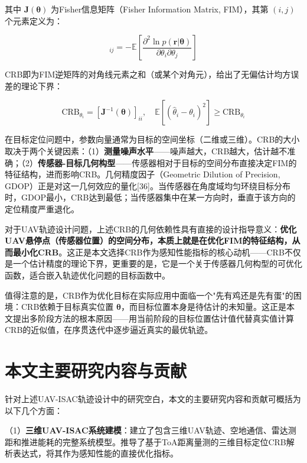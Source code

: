 其中 $\mathbf{J}(\bm{\theta})$ 为Fisher信息矩阵（Fisher Information Matrix, FIM），其第 $(i,j)$ 个元素定义为：

\begin{equation}
[\mathbf{J}(\bm{\theta})]_{ij}=-\mathbb{E}\left[\frac{\partial^2\ln p(\mathbf{r}|\bm{\theta})}{\partial\theta_i\partial\theta_j}\right]
\label{eq:fim_definition}
\end{equation}

CRB即为FIM逆矩阵的对角线元素之和（或某个对角元），给出了无偏估计均方误差的理论下界：

\begin{equation}
\mathrm{CRB}_{\theta_i}=[\mathbf{J}^{-1}(\bm{\theta})]_{ii},\quad \mathbb{E}[(\hat{\theta}_i-\theta_i)^2]\geq\mathrm{CRB}_{\theta_i}
\label{eq:crb_element}
\end{equation}

在目标定位问题中，参数向量通常为目标的空间坐标（二维或三维）。CRB的大小取决于两个关键因素：（1）\textbf{测量噪声水平}——噪声越大，CRB越大，估计越不准确；（2）\textbf{传感器-目标几何构型}——传感器相对于目标的空间分布直接决定FIM的特征结构，进而影响CRB。几何精度因子（Geometric Dilution of Precision, GDOP）正是对这一几何效应的量化[36]。当传感器在角度域均匀环绕目标分布时，GDOP最小，CRB达到最低；当传感器集中在某一方向时，垂直于该方向的定位精度严重退化。

对于UAV轨迹设计问题，上述CRB的几何依赖性具有直接的设计指导意义：\textbf{优化UAV悬停点（传感器位置）的空间分布，本质上就是在优化FIM的特征结构，从而最小化CRB}。这正是本文选择CRB作为感知性能指标的核心动机——CRB不仅是一个估计精度的理论下界，更重要的是，它是一个关于传感器几何构型的可优化函数，适合嵌入轨迹优化问题的目标函数中。

值得注意的是，CRB作为优化目标在实际应用中面临一个"先有鸡还是先有蛋"的困境：CRB依赖于目标真实位置 $\bm{\theta}$，而目标位置本身是待估计的未知量。这正是本文提出多阶段方法的根本原因——用当前阶段的目标位置估计值代替真实值计算CRB的近似值，在序贯迭代中逐步逼近真实的最优轨迹。

\section{本文主要研究内容与贡献}

针对上述UAV-ISAC轨迹设计中的研究空白，本文的主要研究内容和贡献可概括为以下几个方面：

（1）\textbf{三维UAV-ISAC系统建模}：建立了包含三维UAV轨迹、空地通信、雷达测距和推进能耗的完整系统模型。推导了基于ToA距离量测的三维目标定位CRB解析表达式，将其作为感知性能的直接优化指标。

